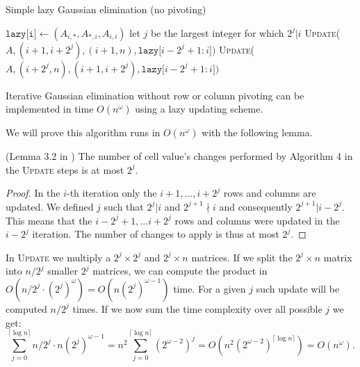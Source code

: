 \begin{algorithm}
\caption{Simple lazy Gaussian elimination (no pivoting)}
\begin{algorithmic}[1]
\State $\texttt{lazy[i]} \gets (A_{i,*}, A_{*, i}, A_{i,i})$
\State let $j$ be the largest integer for which $2^j|i$
\State \textsc{Update}($A, (i+1, i+2^j), (i+1, n), \texttt{lazy[$i-2^j+1:i$]})$
\State \textsc{Update}($A, (i+2^j,n), (i+1,i+2^j), \texttt{lazy[$i-2^j+1:i$]})$
\EndFor
\EndFunction
\end{algorithmic}
\end{algorithm}

\begin{theorem}
Iterative Gaussian elimination without row or column pivoting can be implemented in time $O(n^\omega)$ using a lazy updating scheme. 
\end{theorem}
We will prove this algorithm runs in $O(n^\omega)$ with the following lemma.
\begin{lemma}
(Lemma 3.2 in \cite{mucha}) The number of cell value's changes performed by Algorithm 4 in the \textsc{Update} steps is at most $2^j$.
\end{lemma}
\begin{proof}
In the $i$-th iteration only the $i+1,...,i+2^j$ rows and columns are updated.
We defined $j$ such that $2^j|i$ and $2^{j+1}\nmid i$ and consequently $2^{j+1}|i-2^j$.
This means that the $i-2^j+1,...i+2^j$ rows and columns were updated in the $i-2^j$ iteration.
The number of changes to apply is thus at most $2^j$.
\end{proof}
In \textsc{Update} we multiply a $2^j\times2^j$ and $2^j\times n$ matrices.
If we split the $2^j\times n$ matrix into $n/2^j$ smaller $2^j$ matrices, we can compute the product in $O(n/2^j \cdot (2^j)^\omega) = O(n(2^j)^{\omega-1})$ time.
For a given $j$ such update will be computed $n/2^j$ times.
If we now sum the time complexity over all possible $j$ we get:
\[
\sum_{j=0}^{\lceil\log{n}\rceil} n/2^j \cdot n(2^j)^{\omega-1}
= n^2 \sum_{j=0}^{\lceil\log{n}\rceil} (2^{\omega-2})^j
= O(n^2(2^{\omega-2})^{\lceil\log{n}\rceil})
= O(n^\omega).
\]

